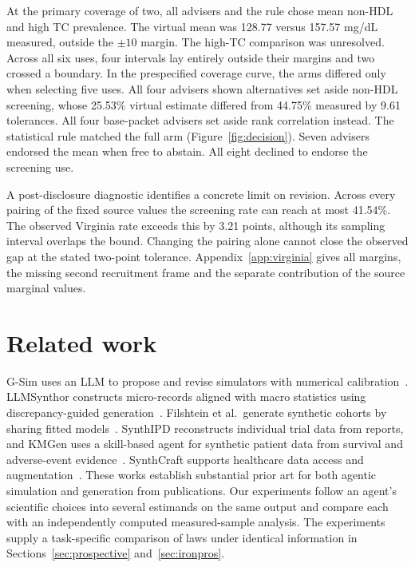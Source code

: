 \documentclass[sigconf,anonymous,review]{acmart}
\begin{document}
At the primary coverage of two, all advisers and the rule chose mean non-HDL and high TC prevalence. The virtual mean was 128.77 versus 157.57 mg/dL measured, outside the $\pm10$ margin. The high-TC comparison was unresolved. Across all six uses, four intervals lay entirely outside their margins and two crossed a boundary. In the prespecified coverage curve, the arms differed only when selecting five uses. All four advisers shown alternatives set aside non-HDL screening, whose 25.53\% virtual estimate differed from 44.75\% measured by 9.61 tolerances. All four base-packet advisers set aside rank correlation instead. The statistical rule matched the full arm (Figure~\ref{fig:decision}). Seven advisers endorsed the mean when free to abstain. All eight declined to endorse the screening use.

A post-disclosure diagnostic identifies a concrete limit on revision. Across every pairing of the fixed source values the screening rate can reach at most 41.54\%. The observed Virginia rate exceeds this by 3.21 points, although its sampling interval overlaps the bound. Changing the pairing alone cannot close the observed gap at the stated two-point tolerance. Appendix~\ref{app:virginia} gives all margins, the missing second recruitment frame and the separate contribution of the source marginal values.

\section{Related work}
G-Sim uses an LLM to propose and revise simulators with numerical calibration~\cite{gsim}. LLMSynthor constructs micro-records aligned with macro statistics using discrepancy-guided generation~\cite{llmsynthor}. Filshtein et al.\ generate synthetic cohorts by sharing fitted models~\cite{filshtein}. SynthIPD reconstructs individual trial data from reports, and KMGen uses a skill-based agent for synthetic patient data from survival and adverse-event evidence~\cite{synthipd,kmgen}. SynthCraft supports healthcare data access and augmentation~\cite{synthcraft}. These works establish substantial prior art for both agentic simulation and generation from publications. Our experiments follow an agent's scientific choices into several estimands on the same output and compare each with an independently computed measured-sample analysis. The experiments supply a task-specific comparison of laws under identical information in Sections~\ref{sec:prospective} and~\ref{sec:ironpros}.
\end{document}
